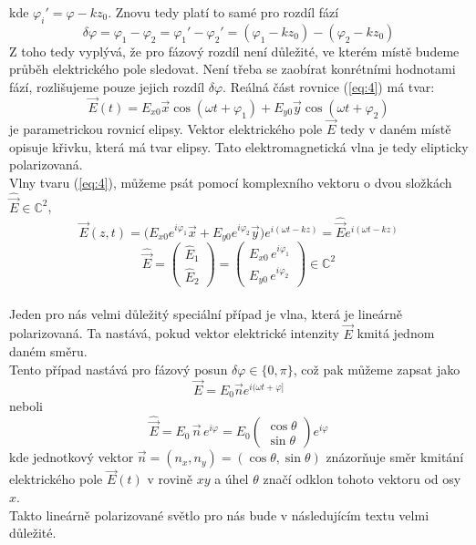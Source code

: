 \documentclass[a4paper]{article}
\numberwithin{equation}{section}
\begin{document}
    kde $\varphi_i' = \varphi - kz_0$. Znovu tedy platí to samé pro rozdíl fází
    \begin{equation} \label{eq:5}
        \delta \varphi = \varphi_1 - \varphi_2 = \varphi_1' - \varphi_2' = (\varphi_1 - kz_0) - (\varphi_2 - kz_0)
    \end{equation}
    Z toho tedy vyplývá, že pro fázový rozdíl není důležité, ve kterém místě budeme průběh elektrického pole
    sledovat. Není třeba se zaobírat konrétními hodnotami fází, rozlišujeme pouze jejich rozdíl $\delta \varphi$.
    Reálná část rovnice (\ref{eq:4}) má tvar:
    \begin{equation} \label{eq:6}
        \vec{E}(t) = E_{x0}\vec{x}\cos(\omega t + \varphi_1) + E_{y0}\vec{y}\cos(\omega t + \varphi_2)
    \end{equation}
    je parametrickou rovnicí elipsy. Vektor elektrického pole $\vec{E}$ tedy v daném místě opisuje křivku,
    která má tvar elipsy. Tato elektromagnetická vlna je tedy elipticky polarizovaná. 
    \\Vlny tvaru (\ref{eq:4}), můžeme psát pomocí komplexního vektoru o dvou složkách $\hat{\vec{E}} \in \mathbb{C}^2$, 
    \begin{equation}
        \vec{E}(z,t) = \big(E_{x0} e^{i\varphi_1} \vec{x} + E_{y0} e^{i\varphi_2} \vec{y} \big)  e^{i(\omega t - kz)} = \hat{\vec{E}} e^{i(\omega t-kz)}
    \end{equation}
    \begin{equation}
        \hat{\vec{E}} = \begin{pmatrix} \hat{E}_1 \\ \hat{E}_2 \end{pmatrix} = \begin{pmatrix} E_{x0} \, e^{i \varphi_1} \\ E_{y0} \, e^{i \varphi_2} \end{pmatrix}	 \in \mathbb{C}^2
    \end{equation}
    \\Jeden pro nás velmi důležitý speciální případ je vlna, která je lineárně polarizovaná. Ta nastává,
    pokud vektor elektrické intenzity $\vec{E}$ kmitá jednom daném směru. 
    \\Tento případ nastává pro fázový posun $\delta \varphi \in \{0,\pi\}$, což pak můžeme zapsat jako
    \begin{equation} \label{eq:7}
        \vec{E} = E_0 \vec{n} e^{i(\omega t + \varphi]}
    \end{equation}
    neboli 
    \begin{equation}
        \hat{\vec{E}} = E_0 \, \vec{n} \, e^{i\varphi} = E_0 \begin{pmatrix} \cos \theta \\ \sin \theta \end{pmatrix} e^{i\varphi}
    \end{equation}
    kde jednotkový vektor $\vec{n} = (n_x,n_y) = (\cos \theta, \sin \theta)$ znázorňuje směr kmitání
    elektrického pole $\vec{E}(t)$ v rovině $xy$ a úhel $\theta$ značí odklon tohoto vektoru od osy $x$.
    \\Takto lineárně polarizované světlo pro nás bude v následujícím textu velmi důležité.
\end{document}
